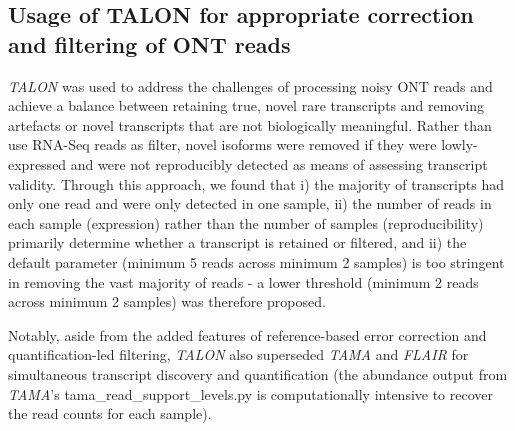 \subsection{Usage of TALON for appropriate correction and filtering of ONT reads}
\textit{TALON} was used to address the challenges of processing noisy ONT reads and achieve a balance between retaining true, novel rare transcripts and removing artefacts or novel transcripts that are not biologically meaningful. Rather than use RNA-Seq reads as filter, novel isoforms were removed if they were lowly-expressed and were not reproducibly detected as means of assessing transcript validity. Through this approach, we found that i) the majority of transcripts had only one read and were only detected in one sample, ii) the number of reads in each sample (expression) rather than the number of samples (reproducibility) primarily determine whether a transcript is retained or filtered, and ii) the default parameter (minimum 5 reads across minimum 2 samples) is too stringent in removing the vast majority of reads - a lower threshold (minimum 2 reads across minimum 2 samples) was therefore proposed. 

Notably, aside from the added features of reference-based error correction and quantification-led filtering, \textit{TALON} also superseded \textit{TAMA} and \textit{FLAIR} for simultaneous transcript discovery and quantification (the abundance output from \textit{TAMA}'s tama\_read\_support\_levels.py is computationally intensive to recover the read counts for each sample). 